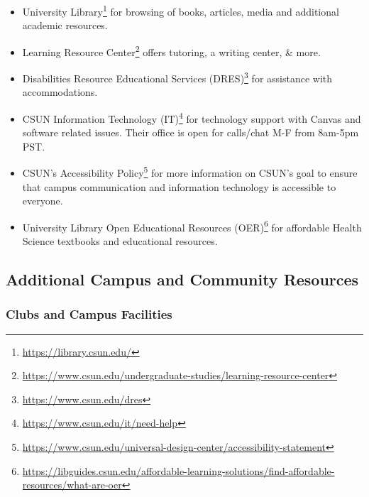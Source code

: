 \documentclass[
  letterpaper,
  DIV=11,
  numbers=noendperiod,
  oneside]{scrartcl}
\DeclareRobustCommand{\href}[2]{#2\footnote{\url{#1}}}
\begin{document}
\begin{itemize}
\item
  University \href{https://library.csun.edu/}{Library} for browsing of
  books, articles, media and additional academic resources.
\item
  \href{https://www.csun.edu/undergraduate-studies/learning-resource-center}{Learning
  Resource Center} offers tutoring, a writing center, \& more.
\item
  \href{https://www.csun.edu/dres}{Disabilities Resource Educational
  Services (DRES)} for assistance with accommodations.
\item
  \href{https://www.csun.edu/it/need-help}{CSUN Information Technology
  (IT)} for technology support with Canvas and software related issues.
  Their office is open for calls/chat M-F from 8am-5pm PST.
\item
  \href{https://www.csun.edu/universal-design-center/accessibility-statement}{CSUN's
  Accessibility Policy} for more information on CSUN's goal to ensure
  that campus communication and information technology is accessible to
  everyone.
\item
  \href{https://libguides.csun.edu/affordable-learning-solutions/find-affordable-resources/what-are-oer}{University
  Library Open Educational Resources (OER)} for affordable Health
  Science textbooks and educational resources.
\end{itemize}

\hypertarget{additional-campus-and-community-resources}{%
\subsection{Additional Campus and Community
Resources}\label{additional-campus-and-community-resources}}

\hypertarget{clubs-and-campus-facilities}{%
\subsubsection{\texorpdfstring{\textbf{Clubs and Campus
Facilities}}{Clubs and Campus Facilities}}\label{clubs-and-campus-facilities}}
\end{document}

